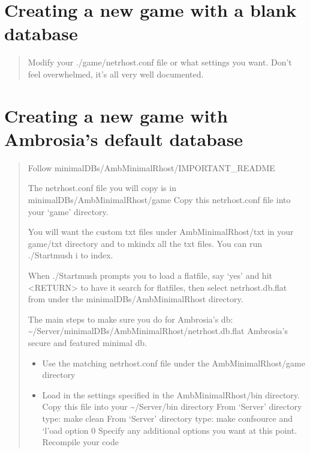 \documentclass[letterpaper,10pt,english]{sphinxmanual}
\begin{document}
\section{Creating a new game with a blank database}
\label{\detokenize{04-configure:creating-a-new-game-with-a-blank-database}}\begin{quote}

\sphinxAtStartPar
Modify your ./game/netrhost.conf file or what settings you want.
Don’t feel overwhelmed, it’s all very well documented.
\end{quote}


\section{Creating a new game with Ambrosia’s default database}
\label{\detokenize{04-configure:creating-a-new-game-with-ambrosia-s-default-database}}\begin{quote}

\sphinxAtStartPar
Follow minimal\sphinxhyphen{}DBs/Amb\sphinxhyphen{}MinimalRhost/IMPORTANT\_README

\sphinxAtStartPar
The netrhost.conf file you will copy is in minimal\sphinxhyphen{}DBs/Amb\sphinxhyphen{}MinimalRhost/game
Copy this netrhost.conf file into your ‘game’ directory.

\sphinxAtStartPar
You will want the custom txt files under Amb\sphinxhyphen{}MinimalRhost/txt in your game/txt
directory and to mkindx all the txt files.  You can run ./Startmush \sphinxhyphen{}i to index.

\sphinxAtStartPar
When ./Startmush prompts you to load a flatfile, say ‘yes’ and hit \textless{}RETURN\textgreater{}
to have it search for flatfiles, then select netrhost.db.flat from under
the minimal\sphinxhyphen{}DBs/Amb\sphinxhyphen{}MinimalRhost directory.

\sphinxAtStartPar
The main steps to make sure you do for Ambrosia’s db:
\textasciitilde{}/Server/minimal\sphinxhyphen{}DBs/Amb\sphinxhyphen{}MinimalRhost/netrhost.db.flat \textendash{} Ambrosia’s secure and featured minimal db.
\begin{itemize}
\item {} 
\sphinxAtStartPar
Use the matching netrhost.conf file under the Amb\sphinxhyphen{}MinimalRhost/game directory

\item {} 
\sphinxAtStartPar
Load in the settings specified in the Amb\sphinxhyphen{}MinimalRhost/bin directory.
\sphinxhyphen{} Copy this file into your \textasciitilde{}/Server/bin directory
\sphinxhyphen{} From ‘Server’ directory type: make clean
\sphinxhyphen{} From ‘Server’ directory type: make confsource and ‘l’oad option 0
\sphinxhyphen{} Specify any \sphinxhyphen{}additional\sphinxhyphen{} options you want at this point.
\sphinxhyphen{} Recompile your code


\end{itemize}
\end{quote}
\end{document}

